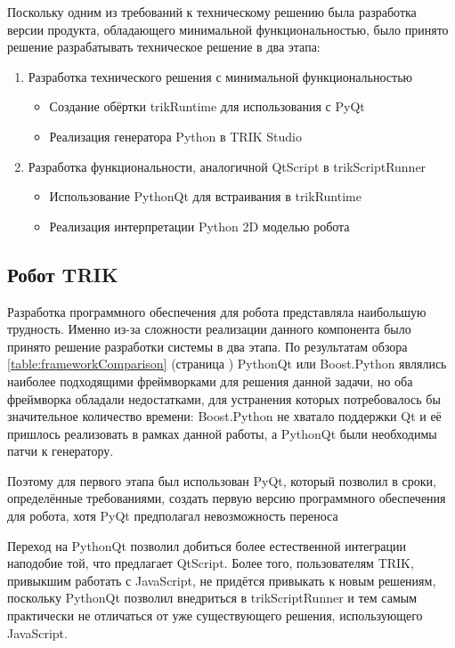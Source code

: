 \documentclass[14pt]{matmex-diploma-custom}
\begin{document}
Поскольку одним из требований к техническому решению была разработка версии продукта, обладающего минимальной функциональностью, было принято решение разрабатывать техническое решение в два этапа:
\begin{enumerate}
    \item Разработка технического решения с минимальной функциональностью
    \begin{itemize}
        \item Создание обёртки trikRuntime для использования с PyQt
        \item Реализация генератора Python в TRIK Studio
    \end{itemize}
    \item Разработка функциональности, аналогичной QtScript в trikScriptRunner
    \begin{itemize}
        \item Использование PythonQt для встраивания в trikRuntime
        \item Реализация интерпретации Python 2D моделью робота
    \end{itemize}
\end{enumerate} 

\subsection{Робот TRIK}
Разработка программного обеспечения для робота представляла наибольшую трудность. Именно из-за сложности реализации данного компонента было принято решение разработки системы в два этапа. По результатам обзора \ref{table:frameworkComparison} (страница \pageref{table:frameworkComparison}) PythonQt или Boost.Python являлись наиболее подходящими фреймворками для решения данной задачи, но оба фреймворка обладали недостатками, для устранения которых потребовалось бы значительное количество времени: Boost.Python не хватало поддержки Qt и её пришлось реализовать в рамках данной работы, а PythonQt были необходимы патчи к генератору.

Поэтому для первого этапа был использован PyQt, который позволил в сроки, определённые требованиями, создать первую версию программного обеспечения для робота, хотя PyQt предполагал невозможность переноса

Переход на PythonQt позволил добиться более естественной интеграции наподобие той, что предлагает QtScript. Более того, пользователям TRIK, привыкшим работать с JavaScript, не придётся привыкать к новым решениям, поскольку PythonQt позволил внедриться в trikScriptRunner и тем самым практически не отличаться от уже существующего решения, использующего JavaScript.
\end{document}
